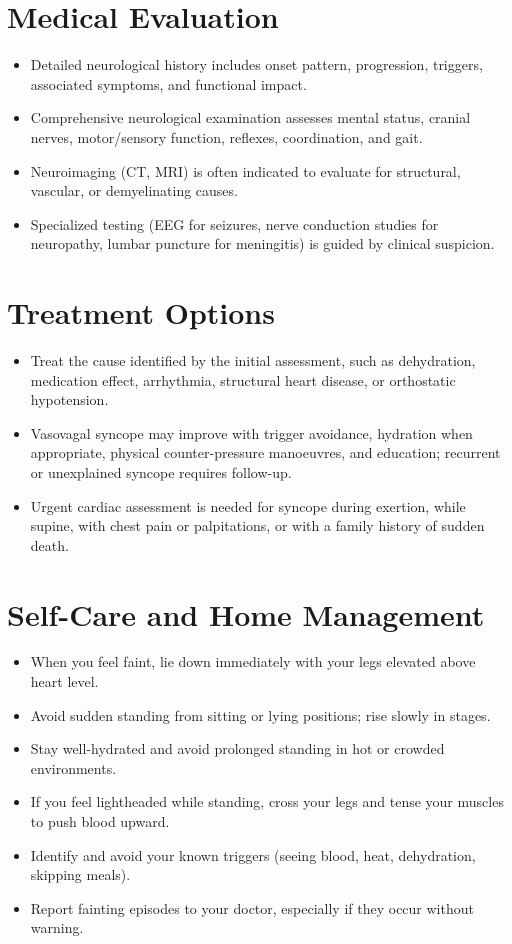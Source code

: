 \section*{Medical Evaluation}
\begin{itemize}
  \item Detailed neurological history includes onset pattern, progression, triggers, associated symptoms, and functional impact.
  \item Comprehensive neurological examination assesses mental status, cranial nerves, motor/sensory function, reflexes, coordination, and gait.
  \item Neuroimaging (CT, MRI) is often indicated to evaluate for structural, vascular, or demyelinating causes.
  \item Specialized testing (EEG for seizures, nerve conduction studies for neuropathy, lumbar puncture for meningitis) is guided by clinical suspicion.
\end{itemize}

\section*{Treatment Options}
\begin{itemize}
  \item Treat the cause identified by the initial assessment, such as dehydration, medication effect, arrhythmia, structural heart disease, or orthostatic hypotension.
  \item Vasovagal syncope may improve with trigger avoidance, hydration when appropriate, physical counter-pressure manoeuvres, and education; recurrent or unexplained syncope requires follow-up.
  \item Urgent cardiac assessment is needed for syncope during exertion, while supine, with chest pain or palpitations, or with a family history of sudden death.
\end{itemize}

\section*{Self-Care and Home Management}
\begin{itemize}
  \item When you feel faint, lie down immediately with your legs elevated above heart level.
  \item Avoid sudden standing from sitting or lying positions; rise slowly in stages.
  \item Stay well-hydrated and avoid prolonged standing in hot or crowded environments.
  \item If you feel lightheaded while standing, cross your legs and tense your muscles to push blood upward.
  \item Identify and avoid your known triggers (seeing blood, heat, dehydration, skipping meals).
  \item Report fainting episodes to your doctor, especially if they occur without warning.
\end{itemize}

